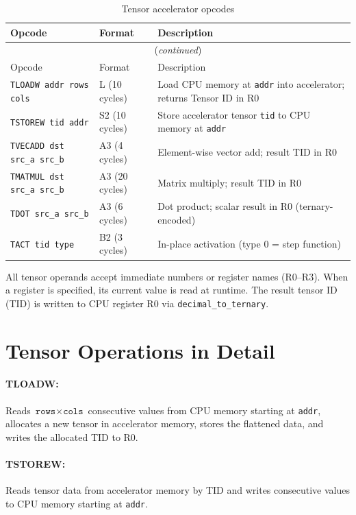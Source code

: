 \documentclass[10pt,a4paper,twoside]{book}
\begin{document}
\begin{longtable}{lll}
\caption{Tensor accelerator opcodes}
\label{tab:tensorlong} \\
\toprule
Opcode & Format & Description \\
\midrule
\endfirsthead
\multicolumn{3}{c}{(\emph{continued})} \\
\toprule
Opcode & Format & Description \\
\midrule
\endhead
\bottomrule
\endfoot
\texttt{TLOADW addr rows cols} & L (10 cycles) & Load CPU memory at \texttt{addr}
into accelerator; returns Tensor ID in R0 \\
\texttt{TSTOREW tid addr} & S2 (10 cycles) & Store accelerator tensor \texttt{tid}
to CPU memory at \texttt{addr} \\
\texttt{TVECADD dst src\_a src\_b} & A3 (4 cycles) & Element-wise vector add;
result TID in R0 \\
\texttt{TMATMUL dst src\_a src\_b} & A3 (20 cycles) & Matrix multiply;
result TID in R0 \\
\texttt{TDOT src\_a src\_b} & A3 (6 cycles) & Dot product; scalar result
in R0 (ternary-encoded) \\
\texttt{TACT tid type} & B2 (3 cycles) & In-place activation
(type 0 = step function) \\
\end{longtable}

All tensor operands accept immediate numbers or register names (R0--R3). When a
register is specified, its current value is read at runtime. The result tensor ID
(TID) is written to CPU register R0 via \texttt{decimal\_to\_ternary}.

\section{Tensor Operations in Detail}

\paragraph{TLOADW:} Reads $\texttt{rows} \times \texttt{cols}$ consecutive values from
CPU memory starting at \texttt{addr}, allocates a new tensor in accelerator memory,
stores the flattened data, and writes the allocated TID to R0.

\paragraph{TSTOREW:} Reads tensor data from accelerator memory by TID and writes
consecutive values to CPU memory starting at \texttt{addr}.
\end{document}
